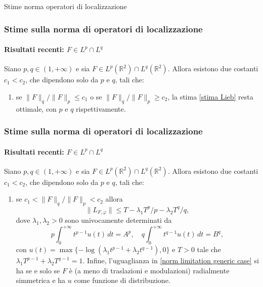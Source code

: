 \documentclass[aspectratio=141]{beamer}
\newcommand\setItemnumber[1]{\setcounter{enumi}{\numexpr#1-1\relax}}
\newcommand{\R}{\mathbb{R}} %
\begin{document}
\begin{section}{Stime norma operatori di localizzazione}
	\begin{frame}
		\frametitle{Stime sulla norma di operatori di localizzazione}
		\framesubtitle{Risultati recenti: $F \in L^p \cap L^q$}
		\begin{myblock}[Teorema]
			Siano $p,q \in (1,+\infty)$ e sia $F \in L^p(\R^2) \cap L^q(\R^2)$. Allora esistono due costanti $c_1 < c_2$, che dipendono solo da $p$ e $q$, tali che:
			\begin{enumerate}
				\item se $\|F\|_q / \|F\|_p \leq c_1$ o se $\|F\|_q / \|F\|_p \geq c_2$, la stima \eqref{stima Lieb} resta ottimale, con $p$ e $q$ rispettivamente.
			\end{enumerate}
		\end{myblock}
	\end{frame}
	
	\begin{frame}
		\frametitle{Stime sulla norma di operatori di localizzazione}
		\framesubtitle{Risultati recenti: $F \in L^p \cap L^q$}
		\begin{myblock}[Teorema]
			{\small Siano $p,q \in (1,+\infty)$ e sia $F \in L^p(\R^2) \cap L^q(\R^2)$. Allora esistono due costanti $c_1 < c_2$, che dipendono solo da $p$ e $q$, tali che:
			\begin{enumerate}
				\setItemnumber{2}
				\item se $c_1 < \|F\|_q / \|F\|_p < c_2$ allora
				\begin{equation}\label{norm limitation generic case}
					\|L_{F,\varphi}\| \leq T - \lambda_1 T^p/p - \lambda_2 T^q/q,
				\end{equation}
				dove $\lambda_1, \lambda_2 > 0$ sono univocamente determinati da
				\begin{equation*}
					p \int_{0}^{+\infty} t^{p-1} u(t) \, dt = A^p, \quad q \int_{0}^{+\infty} t^{q-1} u(t) \, dt = B^q,
				\end{equation*}
				con $u(t) = \max\{-\log(\lambda_1 t^{p-1} + \lambda_2 t^{q-1}), 0\}$ e $T>0$ tale che $\lambda_1 T^{p-1} + \lambda_2 T^{q-1}=1$. Infine, l'uguaglianza in \eqref{norm limitation generic case} si ha se e solo se $F$ è (a meno di traslazioni e modulazioni) radialmente simmetrica e ha $u$ come funzione di distribuzione.
			\end{enumerate}}
		\end{myblock}
	\end{frame}


\end{section}
\end{document}
